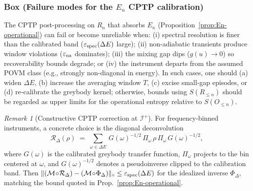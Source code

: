 \documentclass[11pt,a4paper]{article}
\theoremstyle{plain}
\theoremstyle{definition}
\theoremstyle{remark}
\newtheorem{remark}[theorem]{Remark}
\begin{document}
\subsubsection{Box (Failure modes for the $E_n$ CPTP calibration)}
The CPTP post-processing on $R_n$ that absorbs $E_n$ (Proposition~\ref{prop:En-operational}) can fail or become
unreliable when: (i) spectral resolution is finer than the calibrated band
($\varepsilon_{\rm spec}(\Delta E)$ large); (ii) non-adiabatic transients produce window
violations ($\varepsilon_{\rm na}$ dominates); (iii) the mixing gap dips ($g(u)\!\to\!0$)
so recoverability bounds degrade; or (iv) the instrument departs from the assumed POVM
class (e.g., strongly non-diagonal in energy). In such cases, one should (a) widen $\Delta E$,
(b) increase the averaging window $T$, (c) excise small-gap episodes, or (d) re‑calibrate
the greybody kernel; otherwise, bounds using $S(R_{\le n})$ should be regarded as upper
limits for the operational entropy relative to $S(O_{\le n})$.

\begin{remark}[Constructive CPTP correction at $\mathscr{I}^+$]
For frequency-binned instruments, a concrete choice is the diagonal deconvolution
\[
\mathcal{R}_\Delta(\rho)\;=\;\sum_{\omega\in\Delta E}\, G(\omega)^{-1/2}\,\Pi_\omega\,\rho\,\Pi_\omega\,G(\omega)^{-1/2},
\]
where $G(\omega)$ is the calibrated greybody transfer function, $\Pi_\omega$ projects to the bin centered at $\omega$, and $G(\omega)^{-1/2}$ denotes a pseudoinverse clipped to the calibration band. Then $\|(\mathcal{M}\!\circ\!\mathcal{R}_\Delta)-(\mathcal{M}\!\circ\!\Phi_\Delta)\|_\diamond\le \varepsilon_{\rm spec}(\Delta E)$ for the idealized inverse $\Phi_\Delta$, matching the bound quoted in Prop.~\ref{prop:En-operational}.
\end{remark}
\end{document}
